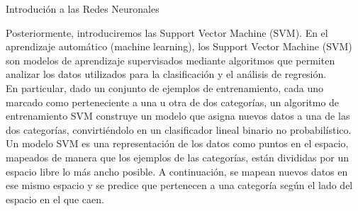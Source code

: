 \documentclass[spanish,xcolor=table]{beamer}
\begin{document}
\begin{section}{Introduci\'on a las Redes Neuronales}
\begin{frame}
Posteriormente, introduciremos las Support Vector Machine (SVM).  En el aprendizaje autom\'atico (machine learning), los Support Vector Machine (SVM) son modelos de aprendizaje supervisados mediante algoritmos que permiten analizar los datos utilizados para la clasificaci\'on y el an\'alisis de regresi\'on.\\
En particular, dado un conjunto de ejemplos de entrenamiento, cada uno marcado como perteneciente a una u otra de dos categor\'{i}as, un algoritmo de entrenamiento SVM construye un modelo que asigna nuevos datos a una de las dos categor\'{i}as, convirti\'endolo en un clasificador lineal binario no probabil\'{i}stico.\\
 Un modelo SVM es una representaci\'on de los datos como puntos en el espacio, mapeados de manera que los ejemplos de las categor\'{i}as, est\'an divididas por un espacio libre lo m\'as ancho posible. A continuaci\'on, se mapean nuevos datos en ese mismo espacio y se predice que pertenecen a una categor\'{i}a seg\'un el lado del espacio en el que caen.

\end{frame}
\end{section}
\end{document}

